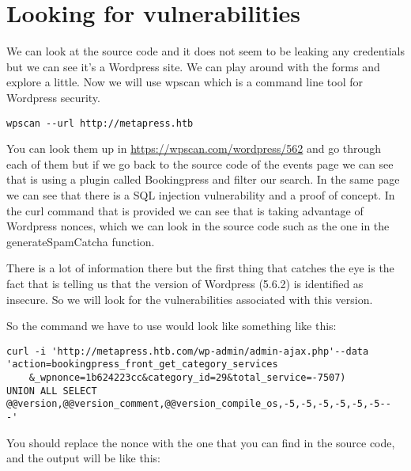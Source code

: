 \documentclass[11pt]{article}
\begin{document}
\section{Looking for vulnerabilities}
\label{sec:org2b1a89b}

We can look at the source code and it does not seem to be leaking any credentials
but we can see it's a Wordpress site. We can play around with the forms and
explore a little. Now we will use wpscan which is a command line tool for Wordpress
security.

\begin{verbatim}
wpscan --url http://metapress.htb
\end{verbatim}


You can look them up in \url{https://wpscan.com/wordpress/562} and go through each of
them but if we go back to the source code of the events page we can see that is
using a plugin called Bookingpress and filter our search. In the same page we
can see that there is a SQL injection vulnerability and a proof of concept.  In
the curl command that is provided we can see that is taking advantage of
Wordpress nonces, which we can look in the source code such as the one in the
generateSpamCatcha function.

There is a lot of information there but the first thing that catches the eye is
the fact that is telling us that the version of Wordpress (5.6.2) is identified
as insecure. So we will look for the vulnerabilities associated with this version.

So the command we have to use would look like something like this:
\begin{verbatim}
curl -i 'http://metapress.htb.com/wp-admin/admin-ajax.php'--data
'action=bookingpress_front_get_category_services
    &_wpnonce=1b624223cc&category_id=29&total_service=-7507)
UNION ALL SELECT @@version,@@version_comment,@@version_compile_os,-5,-5,-5,-5,-5,-5--
-'
\end{verbatim}


You should replace the nonce with the one that you can find in the source code, and the output will be like this:
\end{document}
